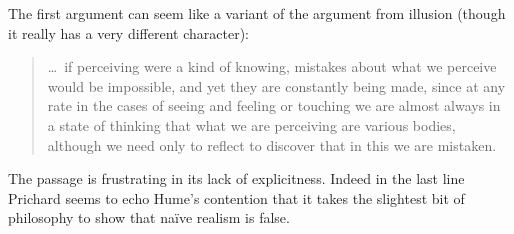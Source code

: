 \documentclass[11pt]{article}
\begin{document}
The first argument can seem like a variant of the argument from illusion (though it really has a very different character): 
\begin{quote}
	\ldots\ if perceiving were a kind of knowing, mistakes about what we perceive would be impossible, and yet they are constantly being made, since at any rate in the cases of seeing and feeling or touching we are almost always in a state of thinking that what we are perceiving are various bodies, although we need only to reflect to discover that in this we are mistaken. \citep[]{Prichard:1938ve}
\end{quote}
The passage is frustrating in its lack of explicitness. Indeed in the last line Prichard seems to echo Hume’s contention that it takes the slightest bit of philosophy to show that naïve realism is false. 
\end{document}
